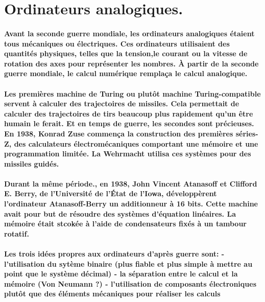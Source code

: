 \section{
  Ordinateurs analogiques.
}

\paragraph{
  Avant la seconde guerre mondiale, les ordinateurs analogiques étaient tous mécaniques ou électriques. Ces ordinateurs utilisaient des quantités physiques, telles que la tension,le courant ou la vitesse de rotation des axes pour représenter les nombres. À partir de la seconde guerre mondiale, le calcul numérique remplaça le calcul analogique.
}

\paragraph{
  Les premières machine de Turing ou plutôt machine Turing-compatible servent à calculer des trajectoires de missiles. Cela permettait de calculer des trajectoires de tirs beaucoup plus rapidement qu'un être humain le ferait. Et en temps de guerre, les secondes sont précieuses. En 1938, Konrad Zuse commença la construction des premières séries-Z, des calculateurs électromécaniques comportant une mémoire et une programmation limitée. La Wehrmacht utilisa ces systèmes pour des missiles guidés.
}

\paragraph{
  Durant la même période., en 1938, John Vincent Atanasoff et Clifford E. Berry, de l'Université de l'État de l'Iowa, développèrent l'ordinateur Atanasoff-Berry un additionneur à 16 bits. Cette machine avait pour but de résoudre des systèmes d'équation linéaires. La mémoire était stcokée à l'aide de condensateurs fixés à un tambour rotatif.
}

\paragraph{
  Les trois idées propres aux ordinateurs d'après guerre sont:
  - l'utilisation du sytème binaire (plus fiable et plus simple à mettre au point que le système décimal)
  - la séparation entre le calcul et la mémoire (Von Neumann ?)
  - l'utilisation de composants électroniques plutôt que des éléments mécaniques pour réaliser les calculs
}
